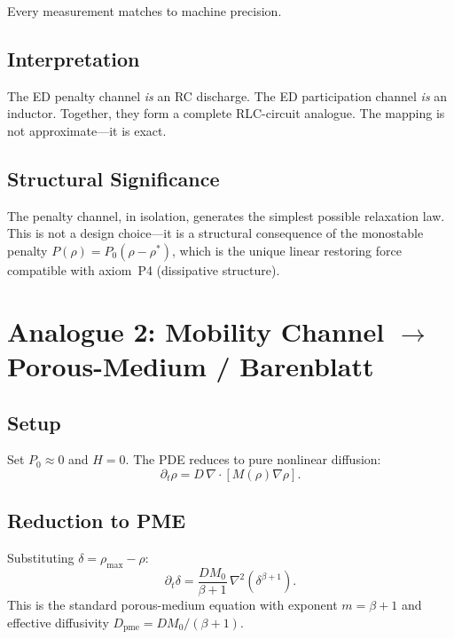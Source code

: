 \documentclass[11pt]{article}
\begin{document}
Every measurement matches to machine precision.

\subsection{Interpretation}

The ED penalty channel \emph{is} an RC discharge. The ED participation channel \emph{is} an inductor. Together, they form a complete RLC-circuit analogue. The mapping is not approximate---it is exact.

\subsection{Structural Significance}

The penalty channel, in isolation, generates the simplest possible relaxation law. This is not a design choice---it is a structural consequence of the monostable penalty \(P(\rho) = P_0(\rho - \rho^*)\), which is the unique linear restoring force compatible with axiom~P4 (dissipative structure).

\section{Analogue 2: Mobility Channel \texorpdfstring{$\to$}{->} Porous-Medium / Barenblatt}

\subsection{Setup}

Set \(P_0 \approx 0\) and \(H = 0\). The PDE reduces to pure nonlinear diffusion:
\begin{equation}\label{eq:pme-ed}
  \partial_t\rho = D\,\nabla\!\cdot\![M(\rho)\nabla\rho].
\end{equation}

\subsection{Reduction to PME}

Substituting \(\delta = \rho_{\max} - \rho\):
\begin{equation}\label{eq:pme}
  \partial_t\delta = \frac{DM_0}{\beta + 1}\,\nabla^2(\delta^{\beta+1}).
\end{equation}
This is the standard porous-medium equation with exponent \(m = \beta + 1\) and effective diffusivity \(D_{\mathrm{pme}} = DM_0/(\beta+1)\).
\end{document}
